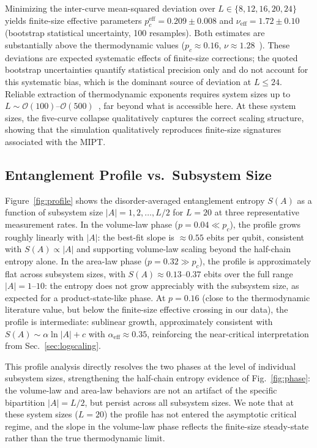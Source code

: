 \documentclass[twocolumn,prl,aps,floatfix]{revtex4-2}
\begin{document}
Minimizing the inter-curve mean-squared deviation over $L \in \{8, 12, 16, 20, 24\}$
yields finite-size effective parameters
$p_c^{\mathrm{eff}} = 0.209 \pm 0.008$ and $\nu_{\mathrm{eff}} = 1.72 \pm 0.10$
(bootstrap statistical uncertainty, 100 resamples).
Both estimates are substantially above the thermodynamic values
($p_c \approx 0.16$, $\nu \approx 1.28$~\cite{Zabalo2020}).
These deviations are expected systematic effects of finite-size corrections;
the quoted bootstrap uncertainties quantify statistical precision only
and do not account for this systematic bias, which is the dominant source of
deviation at $L \leq 24$.
Reliable extraction of thermodynamic exponents requires system sizes up to
$L \sim \mathcal{O}(100)$--$\mathcal{O}(500)$~\cite{Zabalo2020},
far beyond what is accessible here.
At these system sizes, the five-curve collapse qualitatively captures the
correct scaling structure, showing that the simulation qualitatively reproduces finite-size signatures associated with the MIPT.

\subsection{Entanglement Profile vs.\ Subsystem Size}
\label{sec:profile}

Figure~\ref{fig:profile} shows the disorder-averaged entanglement entropy
$S(A)$ as a function of subsystem size $|A| = 1, 2, \ldots, L/2$ for $L = 20$
at three representative measurement rates.
In the volume-law phase ($p = 0.04 \ll p_c$), the profile grows roughly linearly
with $|A|$: the best-fit slope is $\approx 0.55$ ebits per qubit, consistent with
$S(A) \propto |A|$ and supporting volume-law scaling beyond the half-chain entropy
alone.
In the area-law phase ($p = 0.32 \gg p_c$), the profile is approximately flat
across subsystem sizes, with $S(A) \approx 0.13$--$0.37$ ebits over the full
range $|A| = 1$--$10$: the entropy does not grow appreciably with the subsystem
size, as expected for a product-state-like phase.
At $p = 0.16$ (close to the thermodynamic literature value, but below the finite-size effective crossing in our data), the profile is intermediate:
sublinear growth, approximately consistent with $S(A) \sim \alpha\ln|A| + c$
with $\alpha_{\mathrm{eff}} \approx 0.35$, reinforcing the near-critical
interpretation from Sec.~\ref{sec:logscaling}.

This profile analysis directly resolves the two phases at the level of
individual subsystem sizes, strengthening the half-chain entropy evidence of
Fig.~\ref{fig:phase}: the volume-law and area-law behaviors are not an artifact
of the specific bipartition $|A| = L/2$, but persist across all subsystem sizes.
We note that at these system sizes ($L = 20$) the profile has not entered the
asymptotic critical regime, and the slope in the volume-law phase reflects the
finite-size steady-state rather than the true thermodynamic limit.
\end{document}
